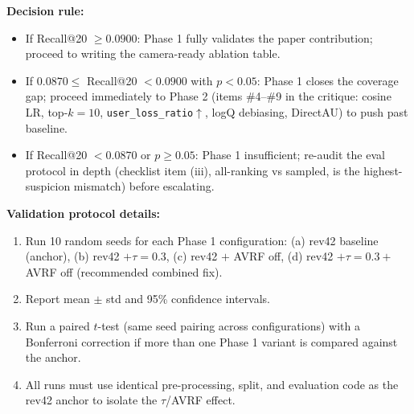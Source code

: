 \documentclass[12pt, a4paper]{article}
\begin{document}
\noindent \textbf{Decision rule:}
\begin{itemize}[leftmargin=*]
    \item If Recall@20 $\geq 0.0900$: Phase 1 fully validates the paper contribution; proceed to writing the camera-ready ablation table.
    \item If $0.0870 \leq$ Recall@20 $< 0.0900$ with $p < 0.05$: Phase 1 closes the coverage gap; proceed immediately to Phase 2 (items \#4--\#9 in the critique: cosine LR, top-$k=10$, \texttt{user\_loss\_ratio}$\uparrow$, logQ debiasing, DirectAU) to push past baseline.
    \item If Recall@20 $< 0.0870$ or $p \geq 0.05$: Phase 1 insufficient; re-audit the eval protocol in depth (checklist item (iii), all-ranking vs sampled, is the highest-suspicion mismatch) before escalating.
\end{itemize}

\noindent \textbf{Validation protocol details:}
\begin{enumerate}[leftmargin=*]
    \item Run 10 random seeds for each Phase 1 configuration: (a) rev42 baseline (anchor), (b) rev42 $+ \tau=0.3$, (c) rev42 $+$ AVRF off, (d) rev42 $+ \tau=0.3 +$ AVRF off (recommended combined fix).
    \item Report mean $\pm$ std and 95\% confidence intervals.
    \item Run a paired $t$-test (same seed pairing across configurations) with a Bonferroni correction if more than one Phase 1 variant is compared against the anchor.
    \item All runs must use identical pre-processing, split, and evaluation code as the rev42 anchor to isolate the $\tau$/AVRF effect.
\end{enumerate}
\end{document}
